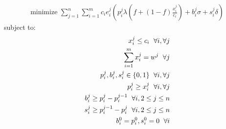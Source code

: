 \begin{align}
\text{minimize } \sum_{j=1}^{n} \sum_{i=1}^{m} c_i e_i^j\left(p_i^j \lambda\left(f+\left(1-f\right)\frac{x_i^j}{c_i}\right) + b_i^j \sigma + s_i^j \delta\right) \label{eq:objective}
\end{align}
subject to:
\begin{align}
x_i^j \le c_i \hspace{6 pt} \forall i, \forall j \label{eq:capcon}\\
\sum_{i = 1}^{m} x_i^j = w^j \hspace{6 pt} \forall j \label{eq:workcon}\\
p_i^j, b_i^j, s_i^j \in \{0,1\} \hspace{6 pt} \forall i, \forall j \label{eq:integer1}\\
p_i^j \ge x_i^j \hspace{6 pt} \forall i, \forall j \label{eq:p1}\\
b_i^j \ge p_i^j - p_i^{j-1} \hspace{6 pt} \forall i, 2 \le j \le n \label{eq:bcon}\\
s_i^j \ge p_i^{j-1} - p_i^j \hspace{6 pt} \forall i, 2 \le j \le n \label{eq:scon}\\
b_i^0 = p_i^0, s_i^0 = 0 \hspace{6 pt} \forall i \label{eq:bcon1}
\end{align}

